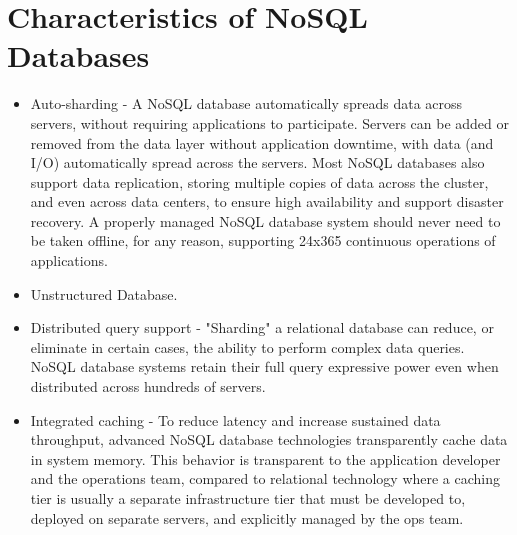\section{Characteristics of NoSQL Databases}
\begin{itemize}
  \item Auto-sharding - A NoSQL database automatically spreads data across servers, without requiring applications to participate. Servers can be added or removed from the data layer without application downtime, with data (and I/O) automatically spread across the servers. Most NoSQL databases also support data replication, storing multiple copies of data across the cluster, and even across data centers, to ensure high availability and support disaster recovery. A properly managed NoSQL database system should never need to be taken offline, for any reason, supporting 24x365 continuous operations of applications.

  \item Unstructured Database.

  \item Distributed query support - "Sharding" a relational database can reduce, or eliminate in certain cases, the ability to perform complex data queries. NoSQL database systems retain their full query expressive power even when distributed across hundreds of servers.

  \item Integrated caching - To reduce latency and increase sustained data throughput, advanced NoSQL database technologies transparently cache data in system memory. This behavior is transparent to the application developer and the operations team, compared to relational technology where a caching tier is usually a separate infrastructure tier that must be developed to, deployed on separate servers, and explicitly managed by the ops team.
\end{itemize}